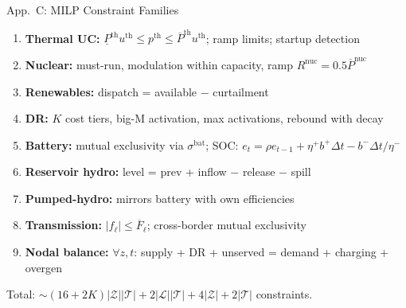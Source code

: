 \documentclass[aspectratio=169, 10pt]{beamer}
\newcommand{\backlink}[2]{\vfill\hfill\hyperlink{#1}{\beamerreturnbutton{\tiny #2}}}
\begin{document}
\begin{frame}{App.\ C: MILP Constraint Families}
\hypertarget{app:C}{}
{\small
\begin{enumerate}
  \item \textbf{Thermal UC:} $\underline{P}^{\mathrm{th}} u^{\mathrm{th}} \leq p^{\mathrm{th}} \leq \overline{P}^{\mathrm{th}} u^{\mathrm{th}}$; ramp limits; startup detection
  \item \textbf{Nuclear:} must-run, modulation within capacity, ramp $R^{\mathrm{nuc}} = 0.5\overline{P}^{\mathrm{nuc}}$
  \item \textbf{Renewables:} dispatch = available $-$ curtailment
  \item \textbf{DR:} $K$ cost tiers, big-M activation, max activations, rebound with decay
  \item \textbf{Battery:} mutual exclusivity via $\sigma^{\mathrm{bat}}$; SOC: $e_t = \rho e_{t-1} + \eta^+ b^+ \Delta t - b^-\Delta t/\eta^-$
  \item \textbf{Reservoir hydro:} level = prev + inflow $-$ release $-$ spill
  \item \textbf{Pumped-hydro:} mirrors battery with own efficiencies
  \item \textbf{Transmission:} $|f_\ell| \leq \overline{F}_\ell$; cross-border mutual exclusivity
  \item \textbf{Nodal balance:} $\forall z,t$: supply + DR + unserved = demand + charging + overgen
\end{enumerate}
}
{\scriptsize Total: $\sim(16+2K)|\mathcal{Z}||\mathcal{T}| + 2|\mathcal{L}||\mathcal{T}| + 4|\mathcal{Z}| + 2|\mathcal{T}|$ constraints.}
\backlink{main:milp}{Block 2: MILP}
\end{frame}
\end{document}
